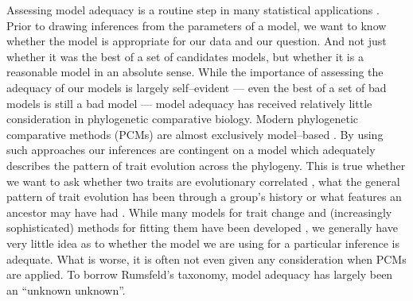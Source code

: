 \documentclass[a4paper,12pt]{article}
\begin{document}
\noindent Assessing model adequacy is a routine step in many statistical applications \citep{Gelmanbook}. Prior to drawing inferences from the parameters of a model, we want to know whether the model is appropriate for our data and our question. And not just whether it was the best of a set of candidates models, but whether it is a reasonable model in an absolute sense. While the importance of assessing the adequacy of our models is largely self--evident --- even the best of a set of bad models is still a bad model --- model adequacy has received relatively little consideration in phylogenetic comparative biology. Modern phylogenetic comparative methods (PCMs) are almost exclusively model--based \citep[recently reviewed in][]{Omeara2012, PennellHarmon}. By using such approaches our inferences are contingent on a model which adequately describes the pattern of trait evolution across the phylogeny. This is true whether we want to ask whether two traits are evolutionary correlated \citep[e.g.][]{Felsenstein1985, Grafen1989, HarveyPagel1991}, what the general pattern of trait evolution has been through a group's history \citep[e.g.][]{Mooers1999, Harmon2010, Hunt2012} or what features an ancestor may have had \citep[e.g.][]{Schluter1997, Huelsenbeck2003}. While many models for trait change and (increasingly sophisticated) methods for fitting them have been developed \citep[e.g.][]{Felsenstein1985, Hansen1997, Pagel1999, ButlerKing2004, Omeara2006, Eastman2011, Beaulieu2012}, we generally have very little idea as to whether the model we are using for a particular inference is adequate. What is worse, it is often not even given any consideration when PCMs are applied. To borrow Rumsfeld's taxonomy, model adequacy has largely been an ``unknown unknown''.
\end{document}
